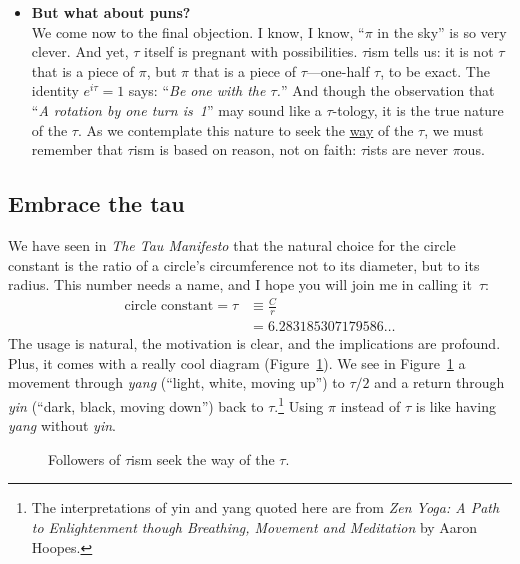 \begin{itemize}
  \item \textbf{But what about puns?} \\ We come now to the final objection. I know, I know, ``$\pi$ in the sky'' is so very clever. And yet, $\tau$ itself is pregnant with possibilities. $\tau$ism tells us: it is not $\tau$ that is a piece of $\pi$, but $\pi$ that is a piece of $\tau$---one-half $\tau$, to be exact. The identity $e^{i\tau} = 1$ says: ``\emph{Be one with the $\tau$.}'' And though the observation that ``\emph{A rotation by one turn is~1}'' may sound like a $\tau$-tology, it is the true nature of the $\tau$. As we contemplate this nature to seek the \href{https://en.wikipedia.org/wiki/Tao}{way} of the $\tau$, we must remember that $\tau$ism is based on reason, not on faith: $\tau$ists are never $\pi$ous.

\end{itemize}


  \subsection{Embrace the tau} %
  \label{sec:embrace_the_tau}

We have seen in \emph{The Tau Manifesto} that the natural choice for the circle constant is the ratio of a circle's circumference not to its diameter, but to its radius. This number needs a name, and I hope you will join me in calling it~$\tau$:
\[
\begin{split}
\mbox{circle constant} = \tau & \equiv \frac{C}{r} \\
                              & = 6.283185307179586\ldots
\end{split}
\]
The usage is natural, the motivation is clear, and the implications are profound. Plus, it comes with a really cool diagram (Figure~\ref{fig:tauism}). We see in Figure~\ref{fig:tauism} a movement through \emph{yang} (``light, white, moving up'') to $\tau/2$ and a return through \emph{yin} (``dark, black, moving down'') back to $\tau$.\footnote{The interpretations of yin and yang quoted here are from \emph{Zen Yoga: A Path to Enlightenment though Breathing, Movement and Meditation} by Aaron Hoopes.} Using $\pi$ instead of $\tau$ is like having \emph{yang} without \emph{yin}.

\begin{figure}
\begin{center}
\end{center}
\caption{Followers of $\tau$ism seek the way of the $\tau$.\label{fig:tauism}}
\end{figure}

